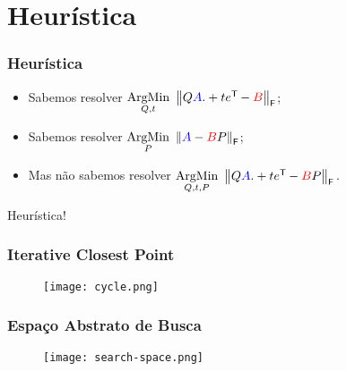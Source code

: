 
\section{Heurística}

\begin{frame}[fragile]
  \frametitle{Heurística}
  \begin{itemize}
    \item Sabemos resolver $\underset{Q,t}{\text{ArgMin}}\,\, \left\lVert Q\textcolor{blue}{A} .+ t e^{\mathsf{T}\mkern-1mu} - \textcolor{red}{B}\right\rVert_\mathsf{F}$; \vspace{1cm}
    \item Sabemos resolver $\underset{P}{\text{ArgMin}}\,\, \left\lVert\textcolor{blue}{A} - \textcolor{red}{B}P\right\rVert_\mathsf{F}$; \vspace{1cm}
    \item Mas não sabemos resolver $\underset{Q,t,P}{\text{ArgMin}}\,\, \left\lVert Q\textcolor{blue}{A} .+ t e^{\mathsf{T}\mkern-1mu} - \textcolor{red}{B}P\right\rVert_\mathsf{F}.$
  \end{itemize}
  \vspace{1cm}
  \begin{center}
    Heurística!
  \end{center}
\end{frame}

\begin{frame}
  \frametitle{Iterative Closest Point}
  \begin{figure}
    \centering
    \texttt{[image: cycle.png]}
  \end{figure}
\end{frame}




\begin{frame}[fragile]
  \frametitle{Espaço Abstrato de Busca}
  \begin{figure}
    \centering
    \texttt{[image: search-space.png]}
  \end{figure}
\end{frame}
